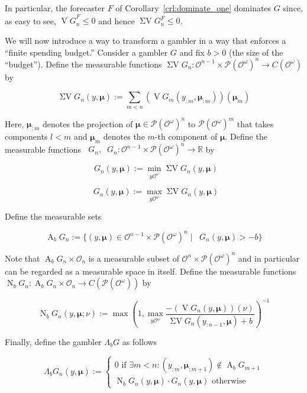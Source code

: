 \documentclass[11pt]{article}
\theoremstyle{definition}
\theoremstyle{plain}
\newcommand{\Reals}{\mathbb{R}}
\newcommand{\PM}{\mathcal{P}}
\newcommand{\Ob}{\mathcal{O}}
\newcommand{\OO}{\Ob^\omega}
\newcommand{\PMO}{\PM(\OO)}
\newcommand{\CO}{C(\OO)}
\DeclareMathOperator{\V}{V}
\DeclareMathOperator{\SV}{\Sigma V}
\DeclareMathOperator{\SVM}{\Sigma V_{\min}}
\DeclareMathOperator{\SVX}{\Sigma V_{\max}}
\DeclareMathOperator{\Ab}{A}
\DeclareMathOperator{\Nr}{N}
\newcommand{\Bd}{\Lambda}
\newcommand{\BM}{\bm{\mu}}
\begin{document}
In particular, the forecaster $F$ of Corollary~\ref{crl:dominate_one} dominates $G$ since, as easy to see, $\overline{\V G}^F_n \leq 0$ and hence $\SV G^F_n \leq 0$.

We will now introduce a way to transform a gambler in a way that enforces a \enquote{finite spending budget.} Consider a gambler $G$ and fix $b > 0$ (the size of the \enquote{budget}). Define the measurable functions $\SV G_n: \Ob^{n-1} \times \PMO^n  \rightarrow \CO$ by

\begin{equation}
\SV G_n\left(y,\BM\right) := \sum_{m < n} \left(\V G_m\left(y_{:m},\BM_{:m}\right)\right)\left(\BM_m\right)
\end{equation}

Here, $\BM_{:m}$ denotes the projection of $\BM \in \PMO^n$ to $\PMO^m$ that takes components $l < m$ and $\BM_m$ denotes the $m$-th component of $\BM$. Define the measurable functions $\SVM G_n, \SVX G_n: \Ob^{n-1} \times \PMO^n  \rightarrow \Reals$ by

\begin{equation}
\SVM G_n\left(y,\BM\right) := \min_{y\OO}{\SV G_n\left(y,\BM\right)}
\end{equation}

\begin{equation}
\SVX G_n\left(y,\BM\right) := \max_{y\OO}{\SV G_n\left(y,\BM\right)}
\end{equation}

Define the measurable sets

\begin{equation}
\Ab_b G_n:=\{\left(y,\BM\right) \in \Ob^{n-1} \times \PMO^n \mid \SVM G_n\left(y,\BM\right) > -b\}
\end{equation}

Note that $\Ab_b G_n \times \Ob_n$ is a measurable subset of $\Ob^n \times \PMO^n$ and in particular can be regarded as a measurable space in itself. Define the measurable functions $\Nr_b G_n: \Ab_b G_n \times \Ob_n \rightarrow C\left(\PMO\right)$ by

\begin{equation}
\Nr_b G_n\left(y,\BM;\nu\right):=\max\left(1,\max_{y\OO} \frac{-\left(\V G_n\left(y,\BM\right)\right)\left(\nu\right)}{\SV G_n\left(y_{:n-1},\BM\right)+b}\right)^{-1}
\end{equation}

Finally, define the gambler $\Bd_b G$ as follows

\begin{equation}
\Bd_b G_n\left(y,\BM\right):=\begin{cases} 0 \text{ if } \exists m < n: \left(y_{:m},\BM_{:m+1}\right) \not\in \Ab_b G_{m+1} \\ \Nr_b G_n\left(y,\BM\right) \cdot G_n\left(y, \BM\right) \text{ otherwise} \end{cases}
\end{equation}
\end{document}
